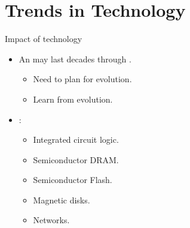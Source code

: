 \section{Trends in Technology}

\begin{frame}[t]{Impact of technology}
\begin{itemize}
  \item An  may last decades 
        through .
    \begin{itemize}
      \item Need to plan for  evolution.
      \item Learn from  evolution.
    \end{itemize}

  \item {}:
    \begin{itemize}
      \item Integrated circuit logic.
      \item Semiconductor DRAM.
      \item Semiconductor Flash.
      \item Magnetic disks.
      \item Networks.
    \end{itemize}
\end{itemize}
\end{frame}


